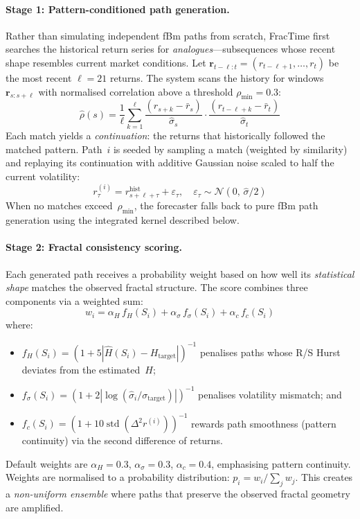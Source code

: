 \documentclass[12pt,a4paper]{article}
\begin{document}
\paragraph{Stage 1: Pattern-conditioned path generation.}
Rather than simulating independent fBm paths from scratch, FracTime first
searches the historical return series for \emph{analogues}---subsequences
whose recent shape resembles current market conditions.  Let
$\mathbf{r}_{t-\ell:t} = (r_{t-\ell+1}, \ldots, r_t)$ be the most recent
$\ell = 21$ returns.  The system scans the history for windows
$\mathbf{r}_{s:s+\ell}$ with normalised correlation above a threshold
$\rho_{\min} = 0.3$:
\begin{equation}
  \hat{\rho}(s) =
    \frac{1}{\ell}\sum_{k=1}^{\ell}
    \frac{(r_{s+k} - \bar{r}_s)}{\hat{\sigma}_s}
    \cdot
    \frac{(r_{t-\ell+k} - \bar{r}_t)}{\hat{\sigma}_t}
  \label{eq:pattern_sim}
\end{equation}
Each match yields a \emph{continuation}: the returns that historically
followed the matched pattern.  Path~$i$ is seeded by sampling a match
(weighted by similarity) and replaying its continuation with additive
Gaussian noise scaled to half the current volatility:
\begin{equation}
  r^{(i)}_{\tau} = r_{s+\ell+\tau}^{\text{hist}} +
    \varepsilon_\tau, \quad
    \varepsilon_\tau \sim \mathcal{N}(0,\, \hat{\sigma}/2)
  \label{eq:pattern_path}
\end{equation}
When no matches exceed~$\rho_{\min}$, the forecaster falls back to pure
fBm path generation using the integrated kernel described below.

\paragraph{Stage 2: Fractal consistency scoring.}
Each generated path receives a probability weight based on how well its
\emph{statistical shape} matches the observed fractal structure.  The score
combines three components via a weighted sum:
\begin{equation}
  w_i = \alpha_H\, f_H(S_i)
       + \alpha_\sigma\, f_\sigma(S_i)
       + \alpha_c\, f_c(S_i)
  \label{eq:fractal_scoring}
\end{equation}
where:
\begin{itemize}
  \item $f_H(S_i) = (1 + 5|\hat{H}(S_i) - H_{\text{target}}|)^{-1}$
        penalises paths whose R/S Hurst deviates from the estimated~$H$;
  \item $f_\sigma(S_i) = (1 + 2|\log(\hat{\sigma}_i / \sigma_{\text{target}})|)^{-1}$
        penalises volatility mismatch; and
  \item $f_c(S_i) = (1 + 10\operatorname{std}(\Delta^2 r^{(i)}))^{-1}$
        rewards path smoothness (pattern continuity) via the second
        difference of returns.
\end{itemize}
Default weights are $\alpha_H = 0.3$, $\alpha_\sigma = 0.3$,
$\alpha_c = 0.4$, emphasising pattern continuity.  Weights are normalised
to a probability distribution: $p_i = w_i / \sum_j w_j$.  This creates a
\emph{non-uniform ensemble} where paths that preserve the observed fractal
geometry are amplified.
\end{document}
